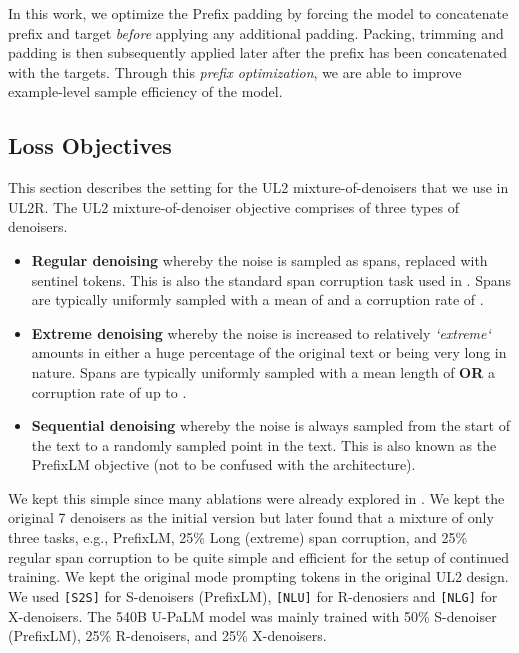 \documentclass{article}
\newcommand{\methodname}{UL2R\xspace}
\newcommand{\modelname}{U-PaLM\xspace}
\begin{document}
In this work, we optimize the Prefix padding by forcing the model to concatenate prefix and target \textit{before} applying any additional padding. Packing, trimming and padding is then subsequently applied later after the prefix has been concatenated with the targets. Through this \textit{prefix optimization}, we are able to improve example-level sample efficiency of the model.

\subsection{Loss Objectives}
\label{sec:objectives}
This section describes the setting for the UL2 mixture-of-denoisers that we use in \methodname. The UL2 mixture-of-denoiser objective comprises of three types of denoisers.
\begin{itemize}
    \item \textbf{Regular denoising} whereby the noise is sampled as spans, replaced with sentinel tokens. This is also the standard span corruption task used in \citet{raffel2019exploring}. Spans are typically uniformly sampled with a mean of  and a corruption rate of .
    \item \textbf{Extreme denoising} whereby the noise is increased to relatively \textit{`extreme`} amounts in either a huge percentage of the original text or being very long in nature. Spans are typically uniformly sampled with a mean length of  \textbf{OR} a corruption rate of up to .
    \item \textbf{Sequential denoising} whereby the noise is always sampled from the start of the text to a randomly sampled point in the text. This is also known as the PrefixLM objective (not to be confused with the architecture).

\end{itemize}


We kept this simple since many ablations were already explored in \citet{tay2022unifying}. We kept the original 7 denoisers as the initial version but later found that a mixture of only three tasks, e.g.,  PrefixLM, 25\% Long (extreme) span corruption, and 25\% regular span corruption to be quite simple and efficient for the setup of continued training. We kept the original mode prompting tokens in the original UL2 design. We used \texttt{[S2S]} for S-denoisers (PrefixLM), \texttt{[NLU]} for R-denosiers and \texttt{[NLG]} for X-denoisers. The 540B \modelname model was mainly trained with 50\% S-denoiser (PrefixLM), 25\% R-denoisers, and 25\% X-denoisers.
\end{document}
